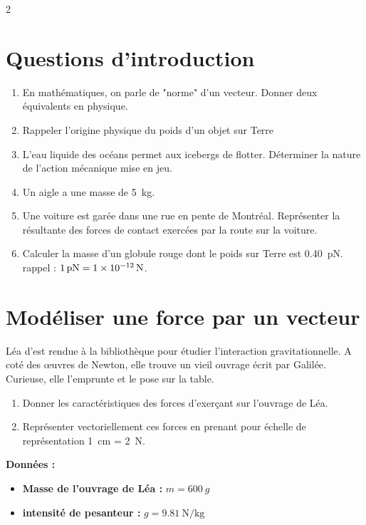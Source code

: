 \documentclass[a4paper,11pt,fleqn]{article}%
\begin{document}
\maketitle

\begin{multicols}{2}
\section{Questions d'introduction}
\begin{enumerate}
    \item En mathématiques, on parle de "norme" d'un vecteur. Donner deux équivalents en physique.
    \item Rappeler l'origine physique du poids d'un objet sur Terre
    \item L'eau liquide des océans permet aux icebergs de flotter. Déterminer la nature de l'action mécanique mise en jeu.
    \item Un aigle a une masse de \SI{5}{kg}.
    \item Une voiture est garée dans une rue en pente de Montréal. Représenter la résultante des forces de contact exercées par la route sur la voiture.
    \item Calculer la masse d'un globule rouge dont le poids sur Terre est \SI{0,40}{\pico\newton}. rappel : $\SI{1}{\pico\newton} = \SI{1E-12}{N}$.
\end{enumerate}

\section{Modéliser une force par un vecteur}
Léa d'est rendue à la bibliothèque pour étudier l'interaction gravitationnelle. A coté des \oe uvres de Newton, elle trouve un vieil ouvrage écrit par Galilée. Curieuse, elle l'emprunte et le pose sur la table.
\begin{enumerate}
    \item Donner les caractéristiques des forces d'exerçant sur l'ouvrage de Léa.
    \item Représenter vectoriellement ces forces en prenant pour échelle de représentation \SI{1}{cm} = \SI{2}{N}.
\end{enumerate}
\textbf{Données :}
\begin{itemize}
    \item \textbf{Masse de l'ouvrage de Léa :} $m=\SI{600}{g}$
    \item \textbf{intensité de pesanteur :} $g=\SI{9,81}{\newton\per\kilo\gram}$
\end{itemize}


\end{multicols}
\end{document}
